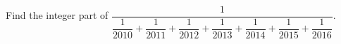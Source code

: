 Find the integer part of $\dfrac{1}{\dfrac{1}{2010}+\dfrac{1}{2011}+\dfrac{1}{2012}+\dfrac{1}{2013}+\dfrac{1}{2014}+\dfrac{1}{2015}+\dfrac{1}{2016}}$.
